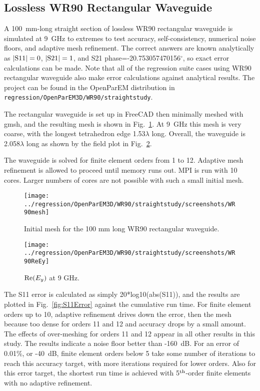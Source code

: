 \documentclass[titlepage]{article}
\renewcommand\_{\textunderscore\linebreak[1]}
\begin{document}
\subsection{Lossless WR90 Rectangular Waveguide}

A 100~mm-long straight section of lossless WR90 rectangular waveguide is simulated at 9~GHz to extremes to test accuracy, self-consistency, numerical noise floors, and adaptive mesh refinement.  The correct answers are known analytically as $|\textnormal{S11}|=0$, $|\textnormal{S21}|=1$, and S21 phase=-20.753057470156$^\circ$, so exact error calculations can be made.  Note that all of the regression suite cases using WR90 rectangular waveguide also make error calculations against analytical results.  The project can be found in the OpenParEM distribution in \texttt{regression/OpenParEM3D/WR90/straight\_study}.

The rectangular waveguide is set up in FreeCAD then minimally meshed with gmsh, and the resulting mesh is shown in Fig.~\ref{fig:WR90mesh}.  At 9~GHz this mesh is very coarse, with the longest tetrahedron edge 1.53$\lambda$ long.  Overall, the waveguide is 2.058$\lambda$ long as shown by the field plot in Fig.~\ref{fig:WR90ReEy}.

The waveguide is solved for finite element orders from 1 to 12.  Adaptive mesh refinement is allowed to proceed until  memory runs out.  MPI is run with 10 cores.  Larger numbers of cores are not possible with such a small initial mesh.

\begin{figure}[H]
  \centering
  \texttt{[image: ../regression/OpenParEM3D/WR90/straight\_study/screenshots/WR90mesh]}
  \caption{Initial mesh for the 100 mm long WR90 rectangular waveguide.}
  \label{fig:WR90mesh}
\end{figure}

\begin{figure}[H]
  \centering
  \texttt{[image: ../regression/OpenParEM3D/WR90/straight\_study/screenshots/WR90ReEy]}
  \caption{$\textnormal{Re}(E_y)$ at 9 GHz.}
  \label{fig:WR90ReEy}
\end{figure}

The S11 error is calculated as simply 20*log10(abs(S11)), and the results are plotted in Fig.~\ref{fig:S11Error} against the cumulative run time.  For finite element orders up to 10, adaptive refinement drives down the error, then the mesh because too dense for orders 11 and 12 and accuracy drops by a small amount. The effects of over-meshing for orders 11 and 12 appear in all other results in this study.  The results indicate a noise floor better than -160~dB.  For an error of 0.01\%, or -40~dB, finite element orders below 5 take some number of iterations to reach this accuracy target, with more iterations required for lower orders.  Also for this error target, the shortest run time is achieved with 5$^{\textnormal{th}}$-order finite elements with no adaptive refinement.
\end{document}
